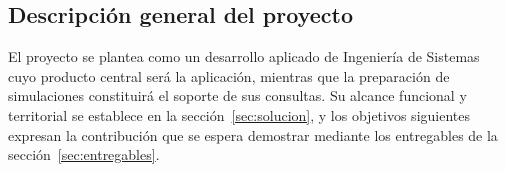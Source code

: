 \subsection{Descripción general del proyecto}\label{sec:descripcion}
El proyecto se plantea como un desarrollo aplicado de Ingeniería de Sistemas cuyo producto central será la aplicación, mientras que la preparación de simulaciones constituirá el soporte de sus consultas. Su alcance funcional y territorial se establece en la sección~\ref{sec:solucion}, y los objetivos siguientes expresan la contribución que se espera demostrar mediante los entregables de la sección~\ref{sec:entregables}.


